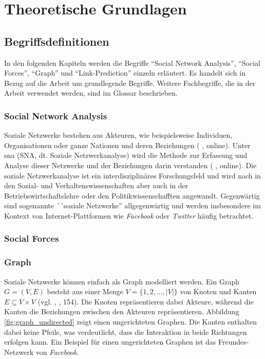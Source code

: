 \chapter{Theoretische Grundlagen}

\section{Begriffsdefinitionen}
In den folgenden Kapiteln werden die Begriffe ``Social Network Analysis'', ``Social Forces'', ``Graph'' und ``Link-Prediction'' einzeln
erläutert. Es handelt sich in Bezug auf die Arbeit um grundlegende Begriffe. Weitere Fachbegriffe, die
in der Arbeit verwendet werden, sind im Glossar beschrieben.

\subsection{Social Network Analysis}
Soziale Netzwerke bestehen aus Akteuren, wie beispielsweise Individuen, Organisationen oder ganze Nationen und deren Beziehungen (\citeauthor{ulrike_baumol_soziale_2019} \citeyear{ulrike_baumol_soziale_2019}, online).
Unter \acl{sna} (SNA, dt. Soziale Netzwerkanalyse) wird die Methode zur Erfassung und Analyse dieser Netzwerke und der Beziehungen darin verstanden (\citeauthor{wikipedia_soziale_2019} \citeyear{wikipedia_soziale_2019}, online).
Die soziale Netzwerkanalyse ist ein interdisziplinäres Forschungsfeld und wird nach \cite{ulrike_baumol_soziale_2019} in den Sozial- und Verhaltenswissenschaften aber auch in der Betriebswirtschaftslehre oder den Politikwissenschafften angewandt.
Gegenwärtig sind sogenannte ´´soziale Netzwerke'' allgegenwärtig und werden insbesondere im Kontext von Internet-Plattformen wie \textit{Facebook} oder \textit{Twitter} häufig betrachtet.

\subsection{Social Forces}
\label{socialforces}

\subsection{Graph}
Soziale Netzwerke können einfach als Graph modelliert werden.
Ein Graph $G = (V, E)$ besteht aus einer Menge $V = \{1,2,...,|V|\}$ von Knoten und Kanten $E \subseteq V\times V $ (vgl. \citeauthor{ottmann_algorithmen_2017}, \citeyear{ottmann_algorithmen_2017}, 154). %
Die Knoten repräsentieren dabei Akteure, während die Kanten die Beziehungen zwischen den Akteuren repräsentieren.
Abbildung \ref{fig:graph_undirected} zeigt einen ungerichteten Graphen. Die Kanten enthalten dabei keine Pfeile, was verdeutlicht, dass die Interaktion in beide Richtungen erfolgen kann.
Ein Beispiel für einen ungerichteten Graphen ist das Freundes-Netzwerk von \textit{Facebook}.

